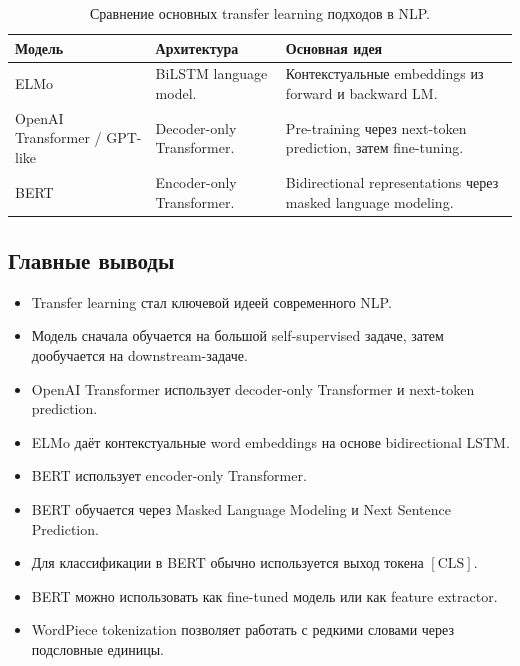 \documentclass[a4paper,12pt]{article}
\begin{document}
\begin{table}[H]
\centering
\begin{tabular}{p{} p{} p{}}
\toprule
\textbf{Модель} & \textbf{Архитектура} & \textbf{Основная идея} \\
\midrule

ELMo &
BiLSTM language model. &
Контекстуальные embeddings из forward и backward LM. \\

OpenAI Transformer / GPT-like &
Decoder-only Transformer. &
Pre-training через next-token prediction, затем fine-tuning. \\

BERT &
Encoder-only Transformer. &
Bidirectional representations через masked language modeling. \\

\bottomrule
\end{tabular}
\caption{Сравнение основных transfer learning подходов в NLP.}
\end{table}

\subsection{Главные выводы}

\begin{itemize}
    \item Transfer learning стал ключевой идеей современного NLP.
    \item Модель сначала обучается на большой self-supervised задаче, затем дообучается на downstream-задаче.
    \item OpenAI Transformer использует decoder-only Transformer и next-token prediction.
    \item ELMo даёт контекстуальные word embeddings на основе bidirectional LSTM.
    \item BERT использует encoder-only Transformer.
    \item BERT обучается через Masked Language Modeling и Next Sentence Prediction.
    \item Для классификации в BERT обычно используется выход токена \([\text{CLS}]\).
    \item BERT можно использовать как fine-tuned модель или как feature extractor.
    \item WordPiece tokenization позволяет работать с редкими словами через подсловные единицы.
\end{itemize}
\end{document}
